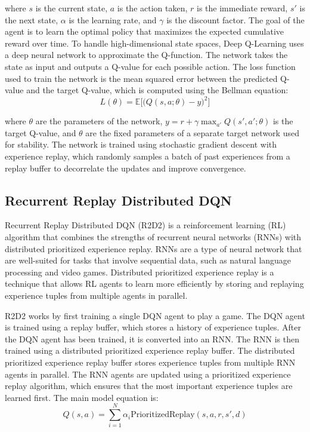 \documentclass[conference]{IEEEtran}
\begin{document}
where $s$ is the current state, $a$ is the action taken, $r$ is the immediate reward, $s'$ is the next state, $\alpha$ is the learning rate, and $\gamma$ is the discount factor. The goal of the agent is to learn the optimal policy that maximizes the expected cumulative reward over time.
To handle high-dimensional state spaces, Deep Q-Learning uses a deep neural network to approximate the Q-function. The network takes the state as input and outputs a Q-value for each possible action. The loss function used to train the network is the mean squared error between the predicted Q-value and the target Q-value, which is computed using the Bellman equation:
\begin{equation} L(\theta) = \mathbb{E} \Big[ \big( Q(s,a;\theta) - y \big)^2 \Big] \end{equation}

where $\theta$ are the parameters of the network, $y = r + \gamma \max_{a'} Q(s',a';\theta)$ is the target Q-value, and $\theta$ are the fixed parameters of a separate target network used for stability. The network is trained using stochastic gradient descent with experience replay, which randomly samples a batch of past experiences from a replay buffer to decorrelate the updates and improve convergence.


\subsection{Recurrent Replay Distributed DQN}
Recurrent Replay Distributed DQN (R2D2) is a reinforcement learning (RL) algorithm that combines the strengths of recurrent neural networks (RNNs) with distributed prioritized experience replay. RNNs are a type of neural network that are well-suited for tasks that involve sequential data, such as natural language processing and video games. Distributed prioritized experience replay is a technique that allows RL agents to learn more efficiently by storing and replaying experience tuples from multiple agents in parallel.

R2D2 works by first training a single DQN agent to play a game. The DQN agent is trained using a replay buffer, which stores a history of experience tuples. After the DQN agent has been trained, it is converted into an RNN. The RNN is then trained using a distributed prioritized experience replay buffer. The distributed prioritized experience replay buffer stores experience tuples from multiple RNN agents in parallel. The RNN agents are updated using a prioritized experience replay algorithm, which ensures that the most important experience tuples are learned first. The main model equation is:
\begin{equation}
Q(s, a) = \sum_{i=1}^N \alpha_i \text{PrioritizedReplay}(s, a, r, s', d)
\end{equation}
\end{document}

